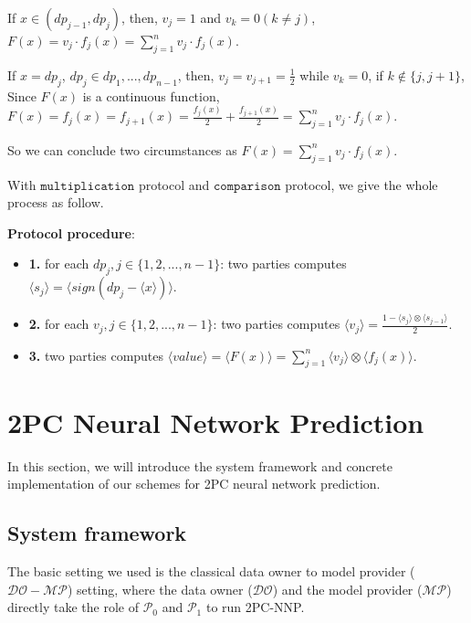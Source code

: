 \documentclass[letterpaper]{article} %
\begin{document}
       If $x\in (dp_{j-1},dp_{j})$, then, $v_{j}=1$ and $v_{k}=0 (k\neq j)$, $F(x)=v_{j}\cdot f_{j}(x)=\sum_{j=1}^{n}v_{j}\cdot f_{j}(x)$.
       
       If $x=dp_{j} $, $ dp_{j}\in {dp_{1},...,dp_{n-1}}$,
       then, $v_{j}=v_{j+1}=\frac{1}{2}$ while $v_{k}=0$, if $ k\notin \{j,j+1\}$,
       Since $F(x)$ is a continuous function,
       $F(x)=f_{j}(x)=f_{j+1}(x)=\frac{f_{j}(x)}{2}+\frac{f_{j+1}(x)}{2}=\sum_{j=1}^{n}v_{j}\cdot f_{j}(x)$.
       
       So we can conclude two circumstances as $F(x)=\sum_{j=1}^{n}v_{j}\cdot f_{j}(x)$.  
       
       With $\mathtt{multiplication}$ protocol and $\mathtt{comparison}$ protocol, we give the whole process as follow.%
       
       
       \textbf{Protocol procedure}:
       
       \begin{itemize}
           \item \textbf{1.} 
           for each $dp_{j},j\in\{1,2,...,n-1\}$:
           two parties computes $\langle s_{j}\rangle=\langle sign(dp_{j}-\langle x\rangle)\rangle$.
       
           \item \textbf{2.}  
           for each $v_{j},j\in\{1,2,...,n-1\}$:
           two parties computes $\langle v_{j} \rangle= \frac{1-\langle s_{j}\rangle\otimes \langle s_{j-1}\rangle}{2}$.
       
           \item \textbf{3.}  
           two parties computes $\langle value\rangle=\langle F(x)\rangle=\sum_{j=1}^{n}\langle v_{j}\rangle\otimes \langle f_{j}(x)\rangle$.
       \end{itemize}
    
    
    \section{2PC Neural Network Prediction}
       In this section, we will introduce the system framework and concrete implementation of our 
       schemes for 2PC neural network prediction. 
       
    \subsection{System framework}
       The basic setting we used is the classical data owner to model provider ($\mathcal{DO}-\mathcal{MP}$) setting, 
       where the data owner ($\mathcal{DO}$) and the model provider ($\mathcal{MP}$)
       directly take the role of $\mathcal{P}_{0}$ and $\mathcal{P}_{1}$ to run 2PC-NNP.
\end{document}
